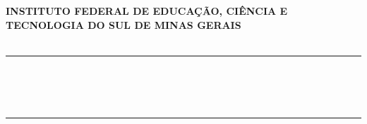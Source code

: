 
\makeatletter
\begin{capa}
	\thispagestyle{empty}%
	
	\setlength{\baselineskip}{0.72\baselineskip}
    \begin{center} %
	

    \large\textbf{\expandafter\uppercase\expandafter{Instituto Federal de Educação, Ciência e \\Tecnologia do Sul de Minas Gerais}}\\
    \large\textbf{\expandafter\uppercase\expandafter{\imprimirdepartamento}}\\
    \large\textbf{\expandafter{}}
    \noindent\rule[0.5ex]{\linewidth}{1pt}
    
	\vspace*{4cm}%
	\large\textbf{\expandafter\uppercase\expandafter{\imprimirnomeautor}}{}
	\large\textbf{\expandafter\uppercase\expandafter{\imprimirsobrenomeautor}}\\
	
	\vspace*{4cm}%
	\large\textbf{\expandafter\uppercase\expandafter{\imprimirtitulotb}}\\
	\text{\expandafter\expandafter{\imprimirsubtitulo}}\\

	\vspace*{\fill}
	\noindent\rule[0.5ex]{\linewidth}{1pt}
	\small\textbf{\expandafter\uppercase\expandafter{\imprimirlocal}}\\
	\small\textbf{\expandafter\uppercase\expandafter{\imprimirdata}}\\
		
		
		
	\end{center} %
\end{capa}
\makeatother
